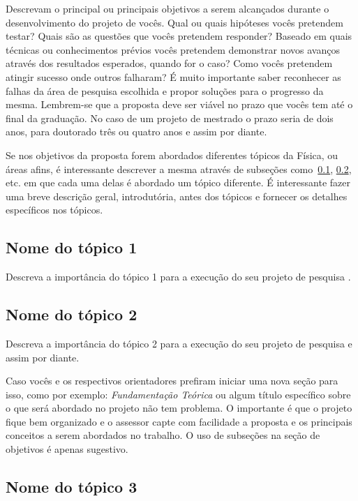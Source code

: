\documentclass[12pt,oneside,brazil,hidelinks,article,sumario=tradicional,a4paper]{abntex2}
\begin{document}
Descrevam o principal ou principais objetivos a serem alcançados durante o desenvolvimento do projeto de vocês. Qual ou quais hipóteses vocês pretendem testar? Quais são as questões que vocês pretendem responder? Baseado em quais técnicas ou conhecimentos prévios vocês pretendem demonstrar novos avanços através dos resultados esperados, quando for o caso? Como vocês pretendem atingir sucesso onde outros falharam? É muito importante saber reconhecer as falhas da área de pesquisa escolhida e propor soluções para o progresso da mesma. Lembrem-se que a proposta deve ser viável no prazo que vocês tem até o final da graduação. No caso de um projeto de mestrado o prazo seria de dois anos, para doutorado três ou quatro anos e assim por diante.

Se nos objetivos da proposta forem abordados diferentes tópicos da Física, ou áreas afins, é interessante descrever a mesma através de subseções como~\ref{obj1}, \ref{obj2}, etc. em que cada uma delas é abordado um tópico diferente. É interessante fazer uma breve descrição geral, introdutória, antes dos tópicos e fornecer os detalhes específicos nos tópicos.

\subsection{Nome do tópico 1}\label{obj1}

Descreva a importância do tópico 1 para a execução do seu projeto de pesquisa \cites{vene2008}{Collobert2011}{braess2007}.


\subsection{Nome do tópico 2}\label{obj2}

Descreva a importância do tópico 2 para a execução do seu projeto de pesquisa e assim por diante.

Caso vocês e os respectivos orientadores prefiram iniciar uma nova seção para isso, como por exemplo: \emph{Fundamentação Teórica} ou algum título específico sobre o que será abordado no projeto não tem problema. O importante é que o projeto fique bem organizado e o assessor capte com facilidade a proposta e os principais conceitos a serem abordados no trabalho. O uso de subseções na seção de objetivos é apenas sugestivo.

\subsection{Nome do tópico 3}\label{obj3}
\end{document}
